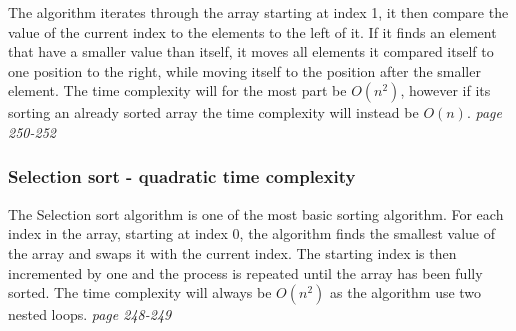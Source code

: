 The algorithm iterates through the array starting at index 1, it then compare the value of the current index to the elements to the left of it. If it finds an element that have a smaller value than itself, it moves all elements it compared itself to one position to the right, while moving itself to the position after the smaller element. 
The time complexity will for the most part be \(O(n^2)\), however if its sorting an already sorted array the time complexity will instead be \(O(n)\). \cite{algo} \emph{page 250-252} \cite{g4g}

\subsubsection*{Selection sort - quadratic time complexity}
\label{sec:1.2.5}
The Selection sort algorithm is one of the most basic sorting algorithm. For each index in the array, starting at index 0, the algorithm finds the smallest value of the array and swaps it with the current index. The starting index is then incremented by one and the process is repeated until the array has been fully sorted.
The time complexity will always be \(O(n^2)\) as the algorithm use two nested loops. \cite{algo} \emph{page 248-249} \cite{g4g}

